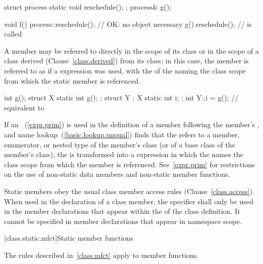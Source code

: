 \begin{codeblock}
struct process {
  static void reschedule();
};
process& g();

void f() {
  process::reschedule();        // OK: no object necessary
  g().reschedule();             //  is called
}
\end{codeblock}
\exitexample

\pnum
A  member may be referred to directly in the scope of its
class or in the scope of a class derived (Clause~\ref{class.derived})
from its class; in this case, the  member is referred to
as if a  expression was used, with the
 of the  naming
the class scope from which the static member is referenced.
\enterexample

\begin{codeblock}
int g();
struct X {
  static int g();
};
struct Y : X {
  static int i;
};
int Y::i = g();                 // equivalent to 
\end{codeblock}
\exitexample

\pnum
If an ~(\ref{expr.prim}) is used in the
definition of a  member following the member's
, and name lookup~(\ref{basic.lookup.unqual})
finds that the  refers to a 
member, enumerator, or nested type of the member's class (or of a base
class of the member's class), the  is
transformed into a  expression in which the
 names the class scope from which the
member is referenced.
\enternote
See~\ref{expr.prim} for restrictions on the use of non-static data
members and non-static member functions.
\exitnote


\pnum
Static members obey the usual class member access rules
(Clause~\ref{class.access}). When used in the declaration of a class
member, the  specifier shall only be used in the member
declarations that appear within the  of
the class definition.
\enternote
It cannot be specified in member declarations that appear in namespace scope.
\exitnote

[class.static.mfct]{Static member functions}
%

\pnum
\enternote
The rules described in~\ref{class.mfct} apply to  member
functions.
\exitnote


